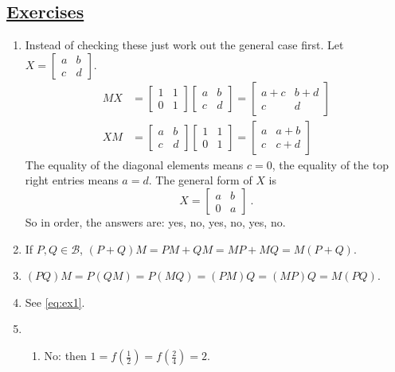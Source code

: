 \documentclass[]{article}
\begin{document}
\subsection*{\underline{Exercises}}
\begin{enumerate}
\item Instead of checking these just work out the general case first. Let $X = \begin{bmatrix}a&b\\c&d\end{bmatrix}$.
\begin{align}
MX &= \begin{bmatrix}1&1\\0&1\end{bmatrix}\begin{bmatrix}a&b\\c&d\end{bmatrix} = \begin{bmatrix}a+c&b+d\\c&d\end{bmatrix} \\
XM &= \begin{bmatrix}a&b\\c&d\end{bmatrix}\begin{bmatrix}1&1\\0&1\end{bmatrix} = \begin{bmatrix}a&a+b\\c&c+d\end{bmatrix}
\end{align}
The equality of the diagonal elements means $c=0$, the equality of the top right entries means $a=d$. The general form of $X$ is
\begin{equation}
X = \begin{bmatrix}a&b\\0&a\end{bmatrix}\ . \label{eq:ex1}
\end{equation}
So in order, the answers are: yes, no, yes, no, yes, no.
\item If $P,Q \in \mathcal{B}$, $(P+Q)M = PM + QM = MP + MQ = M(P+Q)$.
\item $(PQ)M = P(QM) = P(MQ) = (PM)Q = (MP)Q = M(PQ)$.
\item See \eqref{eq:ex1}.
\item \begin{enumerate}
\item No: then $1 = f\left(\frac{1}{2}\right) = f\left(\frac{2}{4}\right) = 2$.

\end{enumerate}
\end{enumerate}
\end{document}
